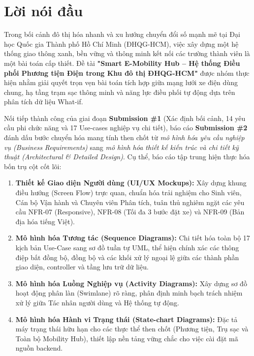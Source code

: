 \documentclass[12pt,a4paper]{article}
\begin{document}
\section*{Lời nói đầu}

Trong bối cảnh đô thị hóa nhanh và xu hướng chuyển đổi số mạnh mẽ tại Đại học Quốc gia Thành phố Hồ Chí Minh (ĐHQG-HCM), việc xây dựng một hệ thống giao thông xanh, bền vững và thông minh kết nối các trường thành viên là một bài toán cấp thiết. Đề tài \textbf{"Smart E-Mobility Hub -- Hệ thống Điều phối Phương tiện Điện trong Khu đô thị ĐHQG-HCM"} được nhóm thực hiện nhằm giải quyết trọn vẹn bài toán tích hợp giữa mạng lưới xe điện dùng chung, hạ tầng trạm sạc thông minh và năng lực điều phối tự động dựa trên phân tích dữ liệu What-if.

Nối tiếp thành công của giai đoạn \textbf{Submission \#1} (Xác định bối cảnh, 14 yêu cầu phi chức năng và 17 Use-cases nghiệp vụ chi tiết), báo cáo \textbf{Submission \#2} đánh dấu bước chuyển hóa mang tính then chốt từ \textit{mô hình hóa yêu cầu nghiệp vụ (Business Requirements)} sang \textit{mô hình hóa thiết kế kiến trúc và chi tiết kỹ thuật (Architectural \& Detailed Design)}. Cụ thể, báo cáo tập trung hiện thực hóa bốn trụ cột cốt lõi:
\begin{enumerate}[nosep]
    \item \textbf{Thiết kế Giao diện Người dùng (UI/UX Mockups):} Xây dựng khung điều hướng (Screen Flow) trực quan, chuẩn hóa trải nghiệm cho Sinh viên, Cán bộ Vận hành và Chuyên viên Phân tích, tuân thủ nghiêm ngặt các yêu cầu NFR-07 (Responsive), NFR-08 (Tối đa 3 bước đặt xe) và NFR-09 (Bản địa hóa tiếng Việt).
    \item \textbf{Mô hình hóa Tương tác (Sequence Diagrams):} Chi tiết hóa toàn bộ 17 kịch bản Use-Case sang sơ đồ tuần tự UML, thể hiện chính xác các thông điệp bất đồng bộ, đồng bộ và các khối xử lý ngoại lệ giữa các thành phần giao diện, controller và tầng lưu trữ dữ liệu.
    \item \textbf{Mô hình hóa Luồng Nghiệp vụ (Activity Diagrams):} Xây dựng sơ đồ hoạt động phân làn (Swimlane) rõ ràng, phân định minh bạch trách nhiệm xử lý giữa Tác nhân người dùng và Hệ thống tự động.
    \item \textbf{Mô hình hóa Hành vi Trạng thái (State-chart Diagrams):} Đặc tả máy trạng thái hữu hạn cho các thực thể then chốt (Phương tiện, Trụ sạc và Toàn bộ Mobility Hub), thiết lập nền tảng vững chắc cho việc cài đặt mã nguồn backend.
\end{enumerate}
\end{document}
